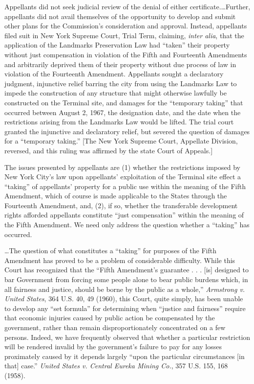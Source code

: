 Appellants did not seek judicial review of the denial of either
certificate.\ldots Further, appellants did not avail themselves of the
opportunity to develop and submit other plans for the Commission's consideration
and approval. Instead, appellants filed suit in New York Supreme Court, Trial
Term, claiming, \textit{inter alia}, that the application of the Landmarks
Preservation Law had ``taken'' their property without just compensation in
violation of the Fifth and Fourteenth Amendments and arbitrarily deprived them
of their property without due process of law in violation of the Fourteenth
Amendment. Appellants sought a declaratory judgment, injunctive relief barring
the city from using the Landmarks Law to impede the construction of any
structure that might otherwise lawfully be constructed on the Terminal site, and
damages for the ``temporary taking'' that occurred between August 2, 1967, the
designation date, and the date when the restrictions arising from the Landmarks
Law would be lifted. The trial court granted the injunctive and declaratory
relief, but severed the question of damages for a ``temporary taking.'' [The New
York Supreme Court, Appellate Division, reversed, and this ruling was affirmed
by the state Court of Appeals.]



The issues presented by appellants are (1) whether the restrictions imposed by
New York City's law upon appellants' exploitation of the Terminal site effect a
``taking'' of appellants' property for a public use within the meaning of the
Fifth Amendment, which of course is made applicable to the States through the
Fourteenth Amendment, and, (2), if so, whether the transferable development
rights afforded appellants constitute ``just compensation'' within the meaning
of the Fifth Amendment. We need only address the question whether a ``taking''
has occurred.



\ldots The question of what constitutes a ``taking'' for purposes of the Fifth
Amendment has proved to be a problem of considerable difficulty. While this
Court has recognized that the ``Fifth Amendment's guarantee . . . [is] designed
to bar Government from forcing some people alone to bear public burdens which,
in all fairness and justice, should be borne by the public as a whole,''
\textit{Armstrong v. United States}, 364 U.S. 40, 49 (1960), this Court, quite
simply, has been unable to develop any ``set formula'' for determining when
``justice and fairness'' require that economic injuries caused by public action
be compensated by the government, rather than remain disproportionately
concentrated on a few persons. Indeed, we have frequently observed that whether
a particular restriction will be rendered invalid by the government's failure to
pay for any losses proximately caused by it depends largely ``upon the
particular circumstances [in that] case.'' \textit{United States v. Central
Eureka Mining Co.}, 357 U.S. 155, 168 (1958).

